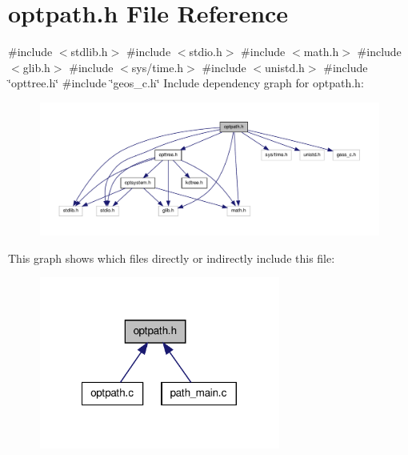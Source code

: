 \hypertarget{a00016}{\section{optpath.\-h \-File \-Reference}
\label{d7/d7a/a00016}
}
{\ttfamily \#include $<$stdlib.\-h$>$}\*
{\ttfamily \#include $<$stdio.\-h$>$}\*
{\ttfamily \#include $<$math.\-h$>$}\*
{\ttfamily \#include $<$glib.\-h$>$}\*
{\ttfamily \#include $<$sys/time.\-h$>$}\*
{\ttfamily \#include $<$unistd.\-h$>$}\*
{\ttfamily \#include \char`\"{}opttree.\-h\char`\"{}}\*
{\ttfamily \#include \char`\"{}geos\-\_\-c.\-h\char`\"{}}\*
\-Include dependency graph for optpath.\-h\-:
\nopagebreak
\begin{figure}[H]
\begin{center}
\leavevmode
\includegraphics[width=350pt]{d6/d5b/a00026}
\end{center}
\end{figure}
\-This graph shows which files directly or indirectly include this file\-:
\nopagebreak
\begin{figure}[H]
\begin{center}
\leavevmode
\includegraphics[width=224pt]{d0/d33/a00027}
\end{center}
\end{figure}
